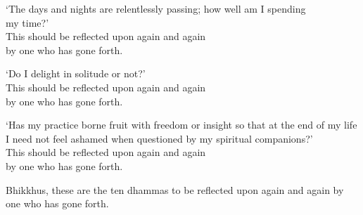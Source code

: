 `The days and nights are relentlessly passing; how well am I spending\\ my time?'\\
This should be reflected upon again and again\\
by one who has gone forth.

`Do I delight in solitude or not?'\\
This should be reflected upon again and again\\
by one who has gone forth.

`Has my practice borne fruit with freedom or insight so that at the end of my life I need not feel ashamed when questioned by my spiritual companions?'\\
This should be reflected upon again and again\\
by one who has gone forth.

Bhikkhus, these are the ten dhammas to be reflected upon again and again by one who has gone forth.


